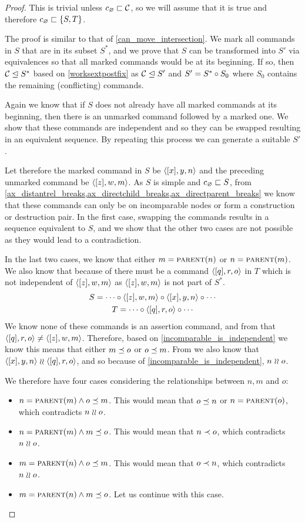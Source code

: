 \begin{proof}
This is trivial unless $c_\varnothing\sqsubset{\mathcal{C}}$, so we will assume that it is true
and therefore $c_\varnothing\sqsubset{\{{S,T}\}}$.

The proof is similar to that of \cref{can_move_intersection}.
We mark all commands in $S$ that are in its subset $S^*$, and
we prove that $S$ can be transformed into $S'$ via equivalences
so that all marked commands would be at its beginning.
If so, then 
${\mathcal{C}}\trianglelefteq{S^*}$ 
based on \cref{worksextpostfix}
as ${\mathcal{C}}\trianglelefteq{S'}$ and $S'=S^*\circ S_0$ 
where $S_0$ contains the remaining (conflicting) commands.

Again we know that if $S$ does not already have all marked commands at its beginning,
then there is an unmarked command followed by a marked one.
We show that these commands are independent and so they can be swapped
resulting in an equivalent sequence.
By repeating this process we can generate a suitable $S'$.

Let therefore the marked command in $S$ be $\langle{[x],y,n}\rangle$
and the preceding unmarked command be $\langle{[z],w,m}\rangle$.
As $S$ is simple and $c_\varnothing\sqsubset{S}$, from 
\cref{ax_distantrel_breaks,ax_directchild_breaks,ax_directparent_breaks}
we know that these commands can only be on incomparable nodes or form a construction or destruction pair.
In the first case, swapping the commands results in a sequence equivalent to $S$,
and we show that the other two cases are not possible as they would lead to a contradiction.

In the last two cases, we know that either $m=\text{\normalfont\scshape{parent}}(n)$ or $n=\text{\normalfont\scshape{parent}}(m)$.
We also know that because of {\condApr} there must be 
a command $\langle{[q],r,o}\rangle$ in $T$ which is not independent of $\langle{[z],w,m}\rangle$
as $\langle{[z],w,m}\rangle$ is not part of $S^*$.
\begin{gather*}
S = \cdots\circ  \langle{[z],w,m}\rangle\circ  \langle{[x],y,n}\rangle\circ  \cdots \\
T = \cdots\circ  \langle{[q],r,o}\rangle\circ \cdots
\end{gather*}
We know none of these commands is an assertion command, and 
from {\condDisj} that $\langle{[q],r,o}\rangle\neq\langle{[z],w,m}\rangle$.
Therefore, based on \cref{incomparable_is_independent} we know this means that
either $m\preceq o$ or $o\preceq m$.
From {\condApr} we also know that $\langle{[x],y,n}\rangle\mathrel{\wr\wr} \langle{[q],r,o}\rangle$,
and so because of \cref{incomparable_is_independent},
$n\mathrel{\wr\wr} o$.

We therefore have four cases considering the relationships between $n,m$ and $o$:
\begin{itemize}
\item $n=\text{\normalfont\scshape{parent}}(m) \wedge o\preceq m$.
   This would mean that $o\preceq n$ or $n=\text{\normalfont\scshape{parent}}(o)$, which contradicts $n\mathrel{\wr\wr} o$.
\item $n=\text{\normalfont\scshape{parent}}(m) \wedge m\preceq o$.
   This would mean that $n\prec o$, which contradicts $n\mathrel{\wr\wr} o$.
\item $m=\text{\normalfont\scshape{parent}}(n) \wedge o\preceq m$.
   This would mean that $o\prec n$, which contradicts $n\mathrel{\wr\wr} o$.
\item $m=\text{\normalfont\scshape{parent}}(n) \wedge m\preceq o$.
   Let us continue with this case.
\end{itemize}


\end{proof}
